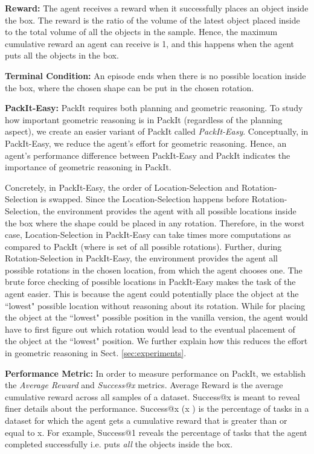 \documentclass{article}
\begin{document}
\noindent\textbf{Reward:} The agent receives a reward when it successfully places an object inside the box. The reward is the ratio of the volume of the latest object placed inside to the total volume of all the objects in the sample. Hence, the maximum cumulative reward an agent can receive is 1, and this happens when the agent puts all the objects in the box.

\noindent\textbf{Terminal Condition:} An episode ends when there is no possible location inside the box, where the chosen shape can be put in the chosen rotation.

\noindent\textbf{PackIt-Easy:} PackIt requires both planning and geometric reasoning. To study how important geometric reasoning is in PackIt (regardless of the planning aspect), we create an easier variant of PackIt called \textit{PackIt-Easy}. Conceptually, in PackIt-Easy, we reduce the agent's effort for geometric reasoning. Hence, an agent's performance difference between PackIt-Easy and PackIt indicates the importance of geometric reasoning in PackIt.

Concretely, in PackIt-Easy, the order of Location-Selection and Rotation-Selection is swapped. Since the Location-Selection happens before Rotation-Selection, the environment provides the agent with all possible locations inside the box where the shape could be placed in any rotation. Therefore, in the worst case, Location-Selection in PackIt-Easy can take  times more computations as compared to PackIt (where  is set of all possible rotations). Further, during Rotation-Selection in PackIt-Easy, the environment provides the agent all possible rotations in the chosen location, from which the agent chooses one. The brute force checking of possible locations in PackIt-Easy makes the task of the agent easier. This is because the agent could potentially place the object at the ``lowest" possible location without reasoning about its rotation. While for placing the object at the ``lowest" possible position in the vanilla version, the agent would have to first figure out which rotation would lead to the eventual placement of the object at the ``lowest" position. We further explain how this reduces the effort in geometric reasoning in Sect. \ref{sec:experiments}. 

\noindent\textbf{Performance Metric: }In order to measure performance on PackIt, we establish the \textit{Average Reward} and \textit{Success@x} metrics. Average Reward is the average cumulative reward across all samples of a dataset. Success@x is meant to reveal finer details about the performance. Success@x (x ) is the percentage of tasks in a dataset for which the agent gets a cumulative reward that is greater than or equal to x. For example, Success@1 reveals the percentage of tasks that the agent completed successfully i.e. puts \textit{all} the objects inside the box.
\end{document}
